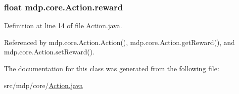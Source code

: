 \subsubsection[{reward}]{\setlength{\rightskip}{0pt plus 5cm}float mdp.\+core.\+Action.\+reward\hspace{0.3cm}{\ttfamily [private]}}\label{classmdp_1_1core_1_1_action_a6eb542e734aab31ad3c0af8eb7c6f92f}


Definition at line 14 of file Action.\+java.



Referenced by mdp.\+core.\+Action.\+Action(), mdp.\+core.\+Action.\+get\+Reward(), and mdp.\+core.\+Action.\+set\+Reward().



The documentation for this class was generated from the following file\+:\begin{DoxyCompactItemize}
\item 
src/mdp/core/\hyperlink{_action_8java}{Action.\+java}\end{DoxyCompactItemize}
